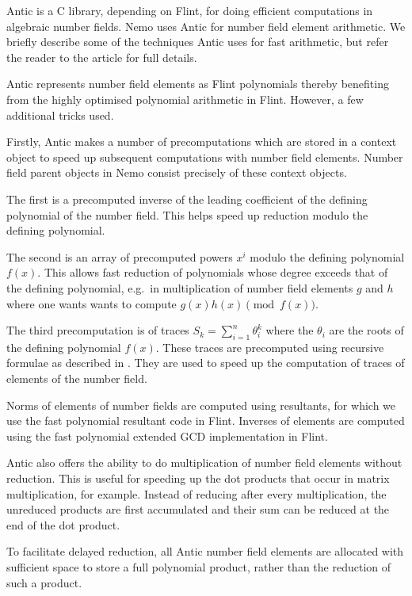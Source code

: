 \documentclass{sig-alternate-05-2015}
\begin{document}
Antic is a C library, depending on Flint, for
doing efficient computations in algebraic number fields. 
Nemo uses Antic for number field element arithmetic. We briefly describe some
of the techniques Antic uses for fast arithmetic, but
refer the reader to the article \cite{antic} for full details.

Antic represents number field elements as Flint polynomials thereby benefiting
from the highly optimised polynomial arithmetic in Flint. However, a few
additional tricks used.

Firstly, Antic makes a number of precomputations which are stored in a context
object to speed up subsequent computations with number field elements. Number field parent
objects in Nemo consist precisely of these context objects.

The first is a precomputed inverse of the leading coefficient of the defining
polynomial of the number field. This helps speed up reduction modulo the defining polynomial.

The second is an array of precomputed powers $x^i$ modulo the
defining polynomial $f(x)$. This allows fast reduction of polynomials whose degree exceeds
that of the defining polynomial, e.g.\ in multiplication of number field elements $g$ and $h$
where one wants wants to compute $g(x)h(x) \pmod{f(x)}$.

The third precomputation is of traces $S_k = \sum_{i=1}^n \theta_i^k$ where the $\theta_i$
are the roots of the defining polynomial $f(x)$. These traces are precomputed using
recursive formulae as described in \cite{Cohen1993}. They are
used to speed up the computation of traces of elements of the number field.

Norms of elements of number fields are computed using resultants, for which we use
the fast polynomial resultant code in Flint. Inverses of elements are computed using the fast polynomial
extended GCD implementation in Flint.

Antic also offers the ability to do multiplication of number field elements without
reduction. This is useful for speeding up the dot products that occur in matrix
multiplication, for example. Instead of reducing after every multiplication, the unreduced
products are first accumulated and their sum can be reduced at the end of the dot product.

To facilitate delayed reduction, all Antic number field elements are allocated with
sufficient space to store a full polynomial product, rather than the reduction of such a product.
\end{document}
